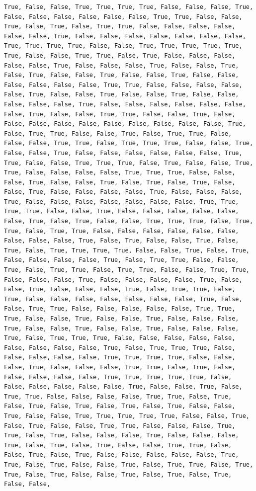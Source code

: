 \documentclass[
  letterpaper,
  DIV=11,
  numbers=noendperiod]{scrartcl}
\begin{document}
\begin{verbatim}
True, False, False, True, True, True, True, False, False, False, True, False, False, False, False, False, False, True, True, False, False, True, False, True, False, True, True, False, False, False, False, False, False, True, False, False, False, False, False, False, False, True, True, True, True, False, False, True, True, True, True, True, True, False, False, True, True, False, True, False, False, False, False, False, True, False, False, False, True, False, False, True, False, True, False, False, True, False, False, True, False, False, False, False, False, False, True, True, False, False, False, False, False, True, False, False, True, False, False, True, False, False, False, False, False, True, False, False, False, False, False, False, False, True, False, False, True, True, False, False, True, False, False, False, False, False, False, False, False, False, False, True, False, True, True, False, False, True, False, True, True, False, False, False, True, True, False, True, True, True, False, False, True, False, False, True, False, False, False, False, False, False, True, True, False, False, True, True, True, False, True, False, False, True, True, False, False, False, False, True, True, True, False, False, False, True, False, False, True, False, True, False, True, False, False, True, False, False, False, False, True, False, False, False, True, False, False, False, False, False, False, False, True, True, True, True, False, False, True, False, False, False, False, False, False, True, False, True, False, False, True, True, True, False, True, True, False, True, True, False, False, False, False, False, False, False, False, False, True, False, True, False, False, True, False, True, False, True, True, True, True, False, False, True, False, True, False, False, False, False, True, False, True, True, False, False, True, False, True, True, False, True, True, False, False, True, True, False, False, False, True, False, False, False, False, True, False, False, True, False, False, False, True, False, True, True, False, True, False, False, False, False, False, False, False, True, False, False, True, True, False, False, False, False, False, True, True, True, False, False, True, False, False, True, False, False, False, True, False, False, True, False, False, True, False, False, False, True, False, True, True, True, False, False, False, False, False, False, False, False, False, True, False, True, True, True, False, False, False, False, False, True, True, True, True, False, False, False, True, False, False, False, True, True, False, True, False, False, False, False, False, True, True, True, True, True, False, False, False, False, False, False, True, False, False, True, False, True, True, False, False, False, False, True, True, False, True, False, True, False, True, False, True, False, True, False, False, True, False, False, True, True, True, True, True, False, False, True, False, True, False, False, True, True, False, False, False, True, True, False, True, False, False, False, True, False, False, False, True, False, True, False, True, False, False, True, True, False, False, True, False, True, False, False, False, False, False, True, True, False, True, False, False, True, False, True, True, False, True, True, False, True, False, False, True, False, True, False, True, False, False, 
\end{verbatim}
\end{document}
